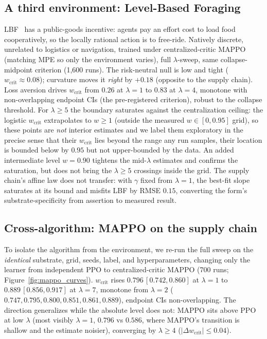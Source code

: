 \documentclass[letterpaper]{article} %
\theoremstyle{plain}
\newcommand{\wcrit}{w_{\mathrm{crit}}}
\begin{document}
\subsection{A third environment: Level-Based Foraging}
LBF~\citep{christianos2020shared} has a public-goods incentive: agents pay an effort cost to
load food cooperatively, so the locally rational action is to free-ride. Natively discrete,
unrelated to logistics or navigation, trained under centralized-critic MAPPO (matching MPE so
only the environment varies), full $\lambda$-sweep, same collapse-midpoint criterion (1{,}600
runs). The risk-neutral null is low and tight ($\wcrit\approx0.08$); curvature moves it
\emph{right} by $+0.18$ (opposite to the supply chain). Loss aversion drives $\wcrit$ from
$0.26$ at $\lambda{=}1$ to $0.83$ at $\lambda{=}4$, monotone with non-overlapping endpoint CIs
(the pre-registered criterion), robust to the collapse threshold. For $\lambda\geq5$ the
boundary saturates against the centralization ceiling: the logistic $\wcrit$ extrapolates to
$w\geq1$ (outside the measured $w\in[0,0.95]$ grid), so these points are \emph{not} interior
estimates and we label them exploratory in the precise sense that their $\wcrit$ lies beyond the
range any run samples, their location is bounded below by $0.95$ but not upper-bounded by the data.
An added intermediate level $w{=}0.90$ tightens the mid-$\lambda$ estimates and confirms the
saturation, but does not bring the $\lambda\geq5$ crossings inside the grid. The supply chain's affine law does not transfer: with $\gamma$ fixed
from $\lambda{=}1$, the best-fit slope saturates at its bound and misfits LBF by RMSE $0.15$,
converting the form's substrate-specificity from assertion to measured result.

\subsection{Cross-algorithm: MAPPO on the supply chain}
To isolate the algorithm from the environment, we re-run the full sweep on the \emph{identical}
substrate, grid, seeds, label, and hyperparameters, changing only the learner from independent
PPO to centralized-critic MAPPO (700 runs; Figure~\ref{fig:mappo_curves}). $\wcrit$ rises
$0.796\,[0.742,0.860]$ at $\lambda{=}1$ to $0.889\,[0.856,0.917]$ at $\lambda{=}7$, monotone
from $\lambda{=}2$ ($0.747,0.795,0.800,0.851,0.861,0.889$), endpoint CIs non-overlapping. The
direction generalizes while the absolute level does not: MAPPO sits above PPO at low $\lambda$
(most visibly $\lambda{=}1$, $0.796$ vs $0.586$, where MAPPO's transition is shallow and the
estimate noisier), converging by $\lambda\geq4$ ($|\Delta\wcrit|\leq0.04$).
\end{document}
